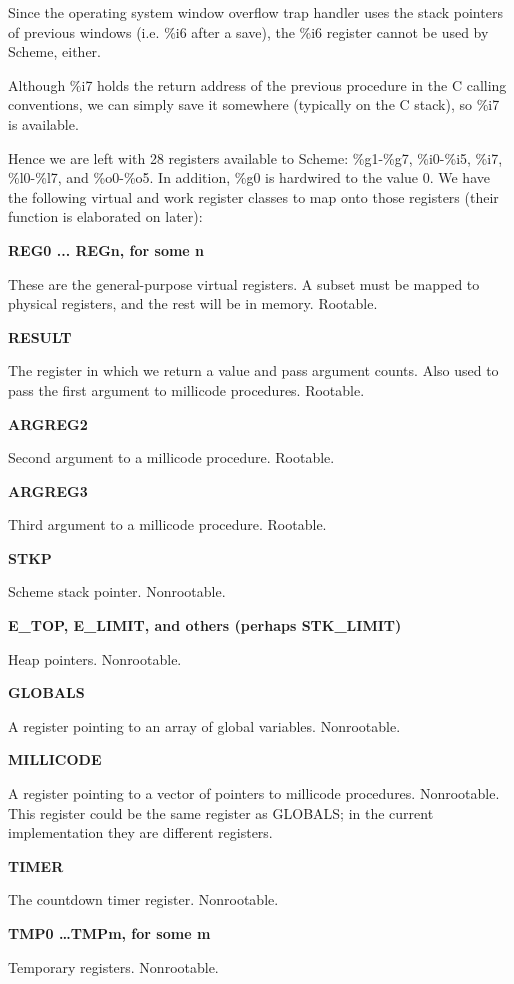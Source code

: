 Since the operating system window overflow trap handler uses the stack
pointers of previous windows (i.e. \%i6 after a save), the \%i6
register cannot be used by Scheme, either.

Although \%i7 holds the return address of the previous procedure in the
C calling conventions, we can simply save it somewhere (typically on
the C stack), so \%i7 is available.

Hence we are left with 28 registers available to Scheme: \%g1-\%g7,
\%i0-\%i5, \%i7, \%l0-\%l7, and \%o0-\%o5. In addition, \%g0 is hardwired
to the value 0. We have the following virtual and work register classes to
map onto those registers (their function is elaborated on later):

\begin{description}

\item {\bf REG0 ... REGn, for some n}

These are the general-purpose virtual registers. A subset must be
mapped to physical registers, and the rest will be in memory.
Rootable.

\item {\bf RESULT}

The register in which we return a value and pass argument counts. Also used
to pass the first argument to millicode procedures. Rootable.

\item {\bf ARGREG2}

Second argument to a millicode procedure. Rootable.

\item {\bf ARGREG3}

Third argument to a millicode procedure. Rootable.

\item {\bf STKP}

Scheme stack pointer. Nonrootable.

\item {\bf E\_TOP, E\_LIMIT, and others (perhaps STK\_LIMIT)}

Heap pointers. Nonrootable.

\item {\bf GLOBALS}

A register pointing to an array of global variables. Nonrootable.

\item {\bf MILLICODE}

A register pointing to a vector of pointers to millicode procedures. 
Nonrootable. This register could be the same register as GLOBALS; in the
current implementation they are different registers.

\item {\bf TIMER}

The countdown timer register. Nonrootable.

\item {\bf TMP0 \ldots TMPm, for some m}

Temporary registers. Nonrootable.
\end{description}

